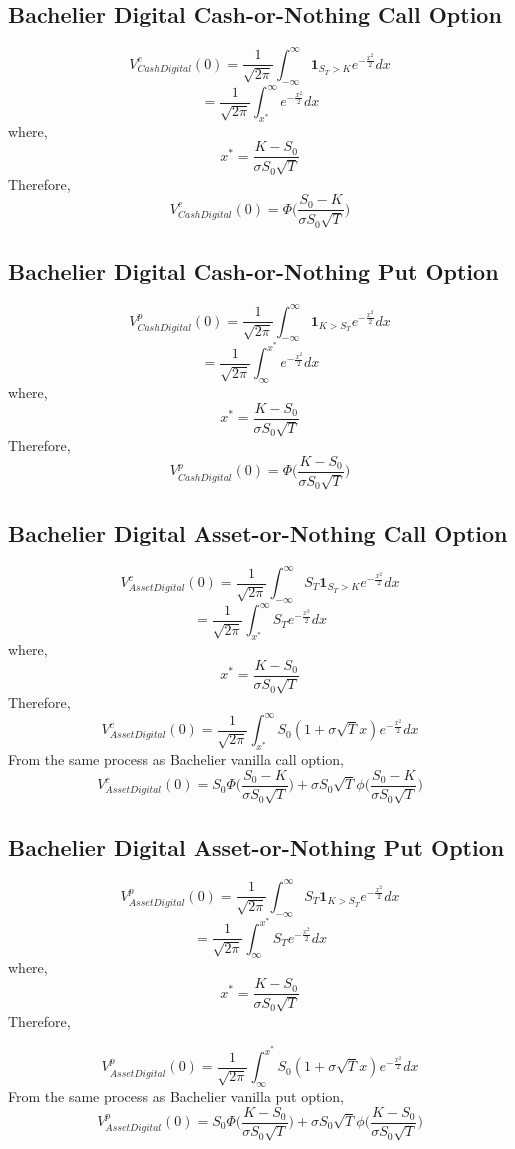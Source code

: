 \documentclass[fleqn,12pt]{SelfArx}
\begin{document}
\subsection{Bachelier Digital Cash-or-Nothing Call Option}
$$
V^{c}_{Cash Digital}(0) = \frac{1}{\sqrt{2\pi}}\int_{-\infty}^{\infty}\mathbf{1}_{S_T>K}e^{-\frac{x^{2}}{2}}dx
$$
$$
= \frac{1}{\sqrt{2\pi}}\int_{x^{*}}^{\infty}e^{-\frac{x^{2}}{2}}dx
$$
where,
$$
x^{*} = \frac{K-S_0}{\sigma S_0\sqrt{T}}
$$
Therefore,
$$
V^{c}_{Cash Digital}(0) = \Phi\bigg(\frac{S_0-K}{\sigma S_0\sqrt{T}}\bigg)
$$

\subsection{Bachelier Digital Cash-or-Nothing Put Option}
$$
V^{p}_{Cash Digital}(0) = \frac{1}{\sqrt{2\pi}}\int_{-\infty}^{\infty}\mathbf{1}_{K>S_T}e^{-\frac{x^{2}}{2}}dx
$$
$$
= \frac{1}{\sqrt{2\pi}}\int_{\infty}^{x^{*}}e^{-\frac{x^{2}}{2}}dx
$$
where,
$$
x^{*} = \frac{K-S_0}{\sigma S_0\sqrt{T}} 
$$
Therefore,
$$
V^{p}_{Cash Digital}(0) = \Phi\bigg(\frac{K-S_0}{\sigma S_0\sqrt{T}}\bigg)
$$
\subsection{Bachelier Digital Asset-or-Nothing Call Option}
$$
V^{c}_{Asset Digital}(0) = \frac{1}{\sqrt{2\pi}}\int_{-\infty}^{\infty}S_T\mathbf{1}_{S_T>K}e^{-\frac{x^{2}}{2}}dx
$$
$$
= \frac{1}{\sqrt{2\pi}}\int_{x^{*}}^{\infty}S_Te^{-\frac{x^{2}}{2}}dx
$$
where,
$$
x^{*} = \frac{K-S_0}{\sigma S_0\sqrt{T}}
$$
Therefore,
$$
V^{c}_{Asset Digital}(0) = \frac{1}{\sqrt{2\pi}}\int_{x^{*}}^{\infty} S_0(1 + \sigma \sqrt{T}x)e^{-\frac{x^{2}}{2}}dx
$$
From the same process as Bachelier vanilla call option,
$$
V^{c}_{Asset Digital}(0) = S_0\Phi\bigg(\frac{S_0-K}{\sigma S_0\sqrt{T}}\Big) + \sigma S_0\sqrt{T}\phi\Big(\frac{S_0-K}{\sigma S_0\sqrt{T}}\bigg)
$$

\subsection{Bachelier Digital Asset-or-Nothing Put Option}
$$
V^{p}_{Asset Digital}(0) = \frac{1}{\sqrt{2\pi}}\int_{-\infty}^{\infty}S_T\mathbf{1}_{K>S_T}e^{-\frac{x^{2}}{2}}dx
$$
$$
= \frac{1}{\sqrt{2\pi}}\int_{\infty}^{x^{*}}S_Te^{-\frac{x^{2}}{2}}dx
$$
where,
$$
x^{*} = \frac{K-S_0}{\sigma S_0\sqrt{T}} 
$$
Therefore,

$$
V^{p}_{Asset Digital}(0) = \frac{1}{\sqrt{2\pi}}\int_{\infty}^{x^{*}} S_0(1 + \sigma \sqrt{T}x)e^{-\frac{x^{2}}{2}}dx
$$
From the same process as Bachelier vanilla put option,
$$
V^{p}_{Asset Digital}(0) = S_0\Phi\bigg(\frac{K-S_0}{\sigma S_0\sqrt{T}}\bigg) + \sigma S_0\sqrt{T}\phi\bigg(\frac{K-S_0}{\sigma S_0\sqrt{T}}\bigg)
$$
\end{document}
